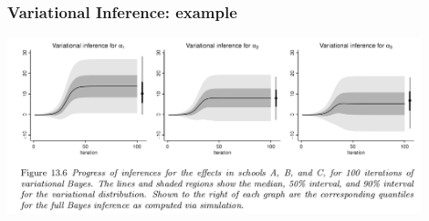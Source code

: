 \documentclass{beamer}
\begin{document}
\begin{frame}[fragile]
\frametitle{Variational Inference: example}

\begin{center}
\includegraphics[width=120mm]{vi_convergence.png}
\end{center}

\end{frame}
\end{document}
